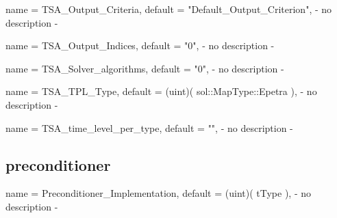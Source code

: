 \begin{parameter}{
    name    = {TSA_Output_Criteria},
    default = {"Default_Output_Criterion"},
}
- no description -
\end{parameter}

\begin{parameter}{
    name    = {TSA_Output_Indices},
    default = {"0"},
}
- no description -
\end{parameter}

\begin{parameter}{
    name    = {TSA_Solver_algorithms},
    default = {"0"},
}
- no description -
\end{parameter}

\begin{parameter}{
    name    = {TSA_TPL_Type},
    default = {(uint)( sol::MapType::Epetra )},
}
- no description -
\end{parameter}

\begin{parameter}{
    name    = {TSA_time_level_per_type},
    default = {""},
}
- no description -
\end{parameter}

\subsection{preconditioner}

\begin{parameter}{
    name    = {Preconditioner_Implementation},
    default = {(uint)( tType )},
}
- no description -
\end{parameter}

